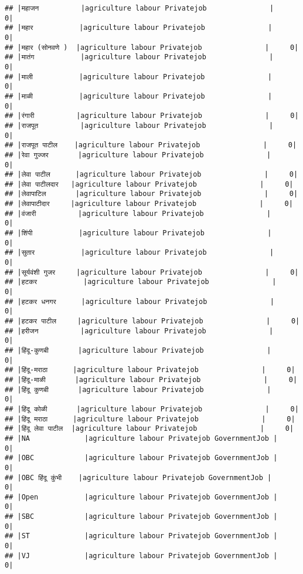 \documentclass[
]{article}
\begin{document}
\begin{verbatim}
## |महाजन          |agriculture labour Privatejob               |     0|
## |महार           |agriculture labour Privatejob               |     0|
## |महार (सोनवणे )  |agriculture labour Privatejob               |     0|
## |मातंग           |agriculture labour Privatejob               |     0|
## |माली           |agriculture labour Privatejob               |     0|
## |माळी           |agriculture labour Privatejob               |     0|
## |रंगारी          |agriculture labour Privatejob               |     0|
## |राजपूत          |agriculture labour Privatejob               |     0|
## |राजपूत पाटील    |agriculture labour Privatejob               |     0|
## |रेवा गुज्जर       |agriculture labour Privatejob               |     0|
## |लेवा पाटील      |agriculture labour Privatejob               |     0|
## |लेवा पाटीलदार   |agriculture labour Privatejob               |     0|
## |लेवापाटिल       |agriculture labour Privatejob               |     0|
## |लेवापाटीदार     |agriculture labour Privatejob               |     0|
## |वंजारी          |agriculture labour Privatejob               |     0|
## |शिंपी           |agriculture labour Privatejob               |     0|
## |सुतार           |agriculture labour Privatejob               |     0|
## |सूर्यवंशी गुजर     |agriculture labour Privatejob               |     0|
## |हटकर           |agriculture labour Privatejob               |     0|
## |हटकर धनगर      |agriculture labour Privatejob               |     0|
## |हटकर पाटील     |agriculture labour Privatejob               |     0|
## |हरीजन          |agriculture labour Privatejob               |     0|
## |हिंदू-कुणबी       |agriculture labour Privatejob               |     0|
## |हिंदू-मराठा      |agriculture labour Privatejob               |     0|
## |हिंदू-माळी       |agriculture labour Privatejob               |     0|
## |हिंदू कुणबी       |agriculture labour Privatejob               |     0|
## |हिंदू कोळी       |agriculture labour Privatejob               |     0|
## |हिंदू मराठा      |agriculture labour Privatejob               |     0|
## |हिंदू लेवा पाटील  |agriculture labour Privatejob               |     0|
## |NA             |agriculture labour Privatejob GovernmentJob |     0|
## |OBC            |agriculture labour Privatejob GovernmentJob |     0|
## |OBC हिंदू कुंभी    |agriculture labour Privatejob GovernmentJob |     0|
## |Open           |agriculture labour Privatejob GovernmentJob |     0|
## |SBC            |agriculture labour Privatejob GovernmentJob |     0|
## |ST             |agriculture labour Privatejob GovernmentJob |     0|
## |VJ             |agriculture labour Privatejob GovernmentJob |     0|

\end{verbatim}
\end{document}
